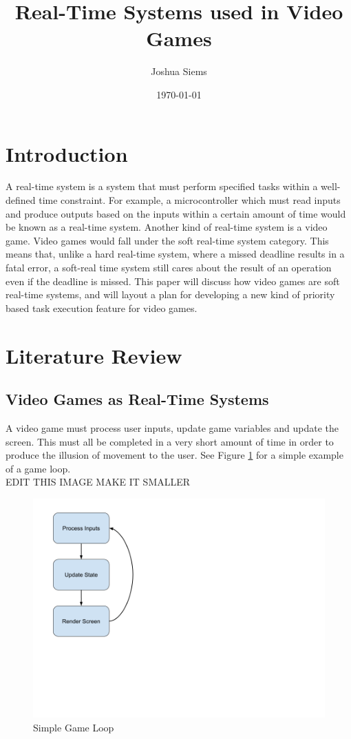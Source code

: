 \documentclass[a4paper, 12pt]{article}
\title{Real-Time Systems used in Video Games}
\author{Joshua Siems}
\date{\today}
\begin{document}

\maketitle


\section{Introduction}
    A real-time system is a system that must perform specified tasks within a well-defined time constraint. For example, a microcontroller which must read inputs and produce outputs based on the inputs within a certain amount of time would be known as a real-time system. Another kind of real-time system is a video game. Video games would fall under the soft real-time system category. This means that, unlike a hard real-time system, where a missed deadline results in a fatal error, a soft-real time system still cares about the result of an operation even if the deadline is missed. This paper will discuss how video games are soft real-time systems, and will layout a plan for developing a new kind of priority based task execution feature for video games. 

\section{Literature Review}

    \subsection{Video Games as Real-Time Systems}
         A video game must process user inputs, update game variables and update the screen. This must all be completed in a very short amount of time in order to produce the illusion of movement to the user. See Figure \ref{update_cycle} for a simple example of a game loop.
         \\
         EDIT THIS IMAGE MAKE IT SMALLER

        \begin{figure}[H]
            \includegraphics[width=12cm]{game_loop_simple.png}
            \centering
            \caption{Simple Game Loop}
            \label{update_cycle}
        \end{figure}
\end{document}
